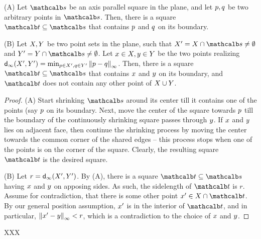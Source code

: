 \documentclass[12pt]{article}%
\begin{document}
\begin{lemma}
    (A) Let $\sqr$ be an axis parallel square in the plane, and let
    $p, q$ be two arbitrary points in $\sqr$. Then, there is a
    square $\sqrA \subseteq \sqr$ that contains $p$ and $q$ on its
    boundary.

    (B) Let $X, Y$ be two point sets in the plane, such that
    $\PSX' = \PSX \cap \sqr \neq \emptyset$ and
    $\PSY' = \PSY \cap \sqr \neq \emptyset$. Let
    $x \in X, y \in Y$ be the two points realizing
    $\dsZ{\infty}{\PSX'}{\PSY'} = \min_{\pa \in \PSX', \pb \in \PSY'}
    \dZ{\infty}{\pa}{\pb}$. Then, there is a square
    $\sqrA \subseteq \sqr$ that contains $x$ and $y$ on its
    boundary, and $\sqrA$ does not contain any other point of
    $X \cup Y$.
\end{lemma}
\begin{proof}
    (A) Start shrinking $\sqr$ around its center till it contains one
    of the points (say $p$ on its boundary. Next, move the center of
    the square towards $p$ till the boundary of the continuously
    shrinking square passes through $y$. If $x$ and $y$ lies on
    adjacent face, then continue the shrinking process by moving the
    center towards the common corner of the shared edges -- this
    process stops when one of the points is on the corner of the
    square.  Clearly, the resulting square $\sqrA$ is the desired
    square.


    (B) Let $r = \dsZ{\infty}{\PSX'}{\PSY'}$. By (A), there is a
    square $\sqrA \subseteq \sqr$ having $x$ and $y$ on apposing
    sides. As such, the sidelength of $\sqrA$ is $r$. Assume for
    contradiction, that there is some other point
    $\px' \in \PSX \cap \sqrA$. By our general position assumption,
    $x'$ is in the interior of $\sqrA$, and in particular,
    $\left\| x' - y \right\|_{\infty} < r$, which is a contradiction to the
    choice of $x$ and $y$.
\end{proof}
XXX
\end{document}
